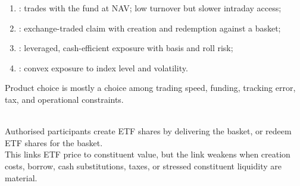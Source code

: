 \begin{taxonomy} 
\begin{enumerate}[label=\roman*.]
\setlength{\itemsep}{0pt}
\item {}: trades with the fund at NAV; low turnover but slower intraday access;
\item {}: exchange-traded claim with creation and redemption against a basket;
\item {}: leveraged, cash-efficient exposure with basis and roll risk;
\item {}: convex exposure to index level and volatility.
\end{enumerate}
Product choice is mostly a choice among trading speed, funding, tracking error, tax, and operational constraints.
\end{taxonomy}

\begin{mechanism} \\
Authorised participants create ETF shares by delivering the basket, or redeem ETF shares for the basket.\\
This links ETF price to constituent value, but the link weakens when creation costs, borrow, cash substitutions, taxes, or stressed constituent liquidity are material.
\end{mechanism}
